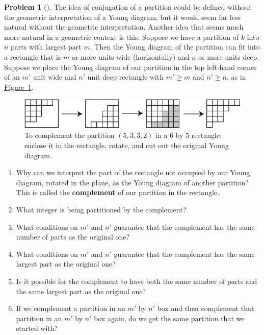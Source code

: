 \documentclass[10pt,]{book}
\newcommand{\terminology}[1]{\textbf{#1}}
\theoremstyle{plain}
\theoremstyle{definition}
\newtheorem{activity}[project]{Problem}
\theoremstyle{definition}
\numberwithin{equation}{chapter}
\begin{document}
\begin{activity}[]\marginsymbol[-1em]{} \label{activity-168}
The idea of conjugation of a partition could be defined without the geometric interpretation of a Young diagram, but it would seem far less natural without the geometric interpretation. Another idea that seems much more natural in a geometric context is this. Suppose we have a partition of \(k\) into \(n\) parts with largest part \(m\). Then the Young diagram of the partition can fit into a rectangle that is \(m\) or more units wide (horizontally) and \(n\) or more units deep. Suppose we place the Young diagram of our partition in the top left-hand corner of an \(m'\) unit wide and \(n'\) unit deep rectangle with \(m'\ge m\) and \(n' \ge n\), as in \hyperref[complementpartition]{Figure~\ref{complementpartition}}.%
\begin{figure}
\centering
\includegraphics[width=0.7\linewidth]{images/complementpartition}
\caption{To complement the partition \((5,3,3,2)\) in a 6 by 5 rectangle: enclose it in the rectangle, rotate, and cut out the original Young diagram.\label{complementpartition}}
\end{figure}
\begin{enumerate}[font=\bfseries,label=(\alph*),ref=\alph*]
\item\label{task-117} \marginsymbol[-2.5em]{} Why can we interpret the part of the rectangle not occupied by our Young diagram, rotated in the plane, as the Young diagram of another partition? This is called the \terminology{complement} of our partition in the rectangle.%
\item\label{task-118} \marginsymbol[-2.5em]{} What integer is being partitioned by the complement?%
\item\label{task-119} \marginsymbol[-2.5em]{} What conditions on \(m'\) and \(n'\) guarantee that the complement has the same number of parts as the original one?%
\item\label{task-120} \marginsymbol[-2.5em]{} What conditions on \(m'\) and \(n'\) guarantee that the complement has the same largest part as the original one?%
\item\label{task-121} \marginsymbol[-2.5em]{} Is it possible for the complement to have both the same number of parts and the same largest part as the original one?%
\item\label{task-122} \marginsymbol[-2.5em]{} If we complement a partition in an \(m'\) by \(n'\) box and then complement that partition in an \(m'\) by \(n'\) box again, do we get the same partition that we started with?%
\end{enumerate}
\end{activity}
\end{document}
